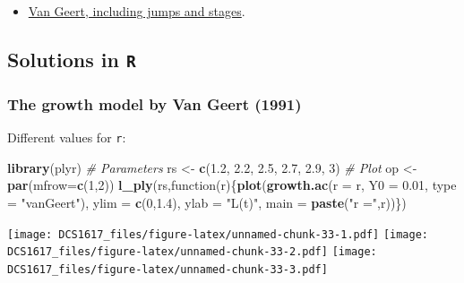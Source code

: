 \documentclass[]{book}
\newenvironment{Shaded}{\begin{snugshade}}{\end{snugshade}}
\newcommand{\KeywordTok}[1]{\textcolor[rgb]{0.13,0.29,0.53}{\textbf{{#1}}}}
\newcommand{\DataTypeTok}[1]{\textcolor[rgb]{0.13,0.29,0.53}{{#1}}}
\newcommand{\DecValTok}[1]{\textcolor[rgb]{0.00,0.00,0.81}{{#1}}}
\newcommand{\FloatTok}[1]{\textcolor[rgb]{0.00,0.00,0.81}{{#1}}}
\newcommand{\StringTok}[1]{\textcolor[rgb]{0.31,0.60,0.02}{{#1}}}
\newcommand{\CommentTok}[1]{\textcolor[rgb]{0.56,0.35,0.01}{\textit{{#1}}}}
\newcommand{\NormalTok}[1]{{#1}}
\providecommand{\tightlist}{%
  \setlength{\itemsep}{0pt}\setlength{\parskip}{0pt}}
\begin{document}
\begin{itemize}
\tightlist
\item
  \href{https://docs.google.com/spreadsheets/d/1DAg0u-zMFOIvRSDOZDxqnzyS0HQJg4FIXzJIMvEMwiI/edit?usp=sharing}{Van
  Geert, including jumps and stages}.
\end{itemize}

\subsection{\texorpdfstring{Solutions in
\texttt{R}}{Solutions in R}}\label{solutions-in-r-1}

\subsubsection*{The growth model by Van Geert
(1991)}\label{the-growth-model-by-van-geert-1991-1}

Different values for \texttt{r}:

\begin{Shaded}
\begin{Highlighting}[]
\KeywordTok{library}\NormalTok{(plyr)}
\CommentTok{# Parameters}
\NormalTok{rs <-}\StringTok{ }\KeywordTok{c}\NormalTok{(}\FloatTok{1.2}\NormalTok{, }\FloatTok{2.2}\NormalTok{, }\FloatTok{2.5}\NormalTok{, }\FloatTok{2.7}\NormalTok{, }\FloatTok{2.9}\NormalTok{, }\DecValTok{3}\NormalTok{)}
\CommentTok{# Plot }
\NormalTok{op <-}\StringTok{ }\KeywordTok{par}\NormalTok{(}\DataTypeTok{mfrow=}\KeywordTok{c}\NormalTok{(}\DecValTok{1}\NormalTok{,}\DecValTok{2}\NormalTok{))}
\KeywordTok{l_ply}\NormalTok{(rs,function(r)\{}\KeywordTok{plot}\NormalTok{(}\KeywordTok{growth.ac}\NormalTok{(}\DataTypeTok{r =} \NormalTok{r,  }\DataTypeTok{Y0 =} \FloatTok{0.01}\NormalTok{, }\DataTypeTok{type =} \StringTok{"vanGeert"}\NormalTok{),}
                          \DataTypeTok{ylim =} \KeywordTok{c}\NormalTok{(}\DecValTok{0}\NormalTok{,}\FloatTok{1.4}\NormalTok{), }\DataTypeTok{ylab =} \StringTok{"L(t)"}\NormalTok{, }\DataTypeTok{main =} \KeywordTok{paste}\NormalTok{(}\StringTok{"r ="}\NormalTok{,r))\})}
\end{Highlighting}
\end{Shaded}

\texttt{[image: DCS1617\_files/figure-latex/unnamed-chunk-33-1.pdf]}
\texttt{[image: DCS1617\_files/figure-latex/unnamed-chunk-33-2.pdf]}
\texttt{[image: DCS1617\_files/figure-latex/unnamed-chunk-33-3.pdf]}
\end{document}

